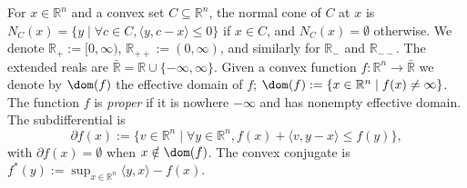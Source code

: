 \documentclass{article}
\theoremstyle{plain}
\theoremstyle{definition}
\theoremstyle{remark}
\begin{document}
For $x \in \mathbb{R}^n$ and a convex set $C \subseteq \mathbb{R}^n$,
the normal cone of $C$ at $x$ is $N_C(x) = \{y \mid \forall c \in C, \langle y, c - x \rangle \le 0\}$
if $x \in C$, and $N_C(x)= \emptyset$ otherwise.
We denote $\mathbb{R}_{+} := [0, \infty)$, $\mathbb{R}_{++}:= (0, \infty)$, and similarly for $\mathbb{R}_{-}$ and $\mathbb{R}_{--}$.
The extended reals are $\bar{\mathbb{R}} = \mathbb{R} \cup \{-\infty, \infty\}$. Given a convex function
$f:\mathbb{R}^n \to \bar{\mathbb{R}}$
we denote by $\dom(f)$ the effective domain of $f$; $\dom(f) := \{x \in
\mathbb{R}^n \mid f(x) \neq \infty\}$.
The function $f$ is \emph{proper} if it is nowhere $-\infty$ and has nonempty effective domain. 
The subdifferential is
\begin{equation*}
\partial f(x) := \{v \in \mathbb{R}^n \mid \forall y \in \mathbb{R}^n, f(x) + \langle v, y-x\rangle \le f(y)\},
\end{equation*}
with $\partial f(x) = \emptyset$ when $x \notin \dom(f)$.
The convex conjugate is $f^*(y):= \sup_{x \in \mathbb{R}^n}\langle y, x\rangle - f(x)$.
\end{document}
